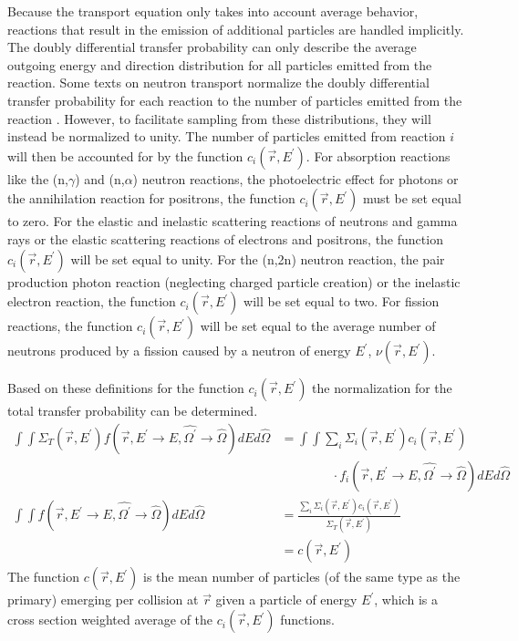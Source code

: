 Because the transport equation only takes into account average behavior, 
reactions that result in the emission of additional particles are handled 
implicitly. The doubly differential transfer probability can only describe the
average outgoing energy and direction distribution for all particles emitted
from the reaction. Some texts on neutron transport normalize the doubly
differential transfer probability for each reaction to the number of particles 
emitted from the reaction \citep{bell_nuclear_1979}. However, to facilitate 
sampling from these distributions, they will instead be normalized to unity. 
The number of particles emitted from reaction $i$ will then be accounted for by 
the function $c_i(\vec{r},E^{'})$. For absorption reactions like the 
(n,$\gamma$) and (n,$\alpha$) neutron reactions, the photoelectric effect for 
photons or the annihilation reaction for positrons, the function 
$c_i(\vec{r},E^{'})$ must be set equal to zero. For the elastic and inelastic 
scattering reactions of neutrons and gamma rays or the elastic scattering
reactions of electrons and positrons, the function $c_i(\vec{r},E^{'})$ will be 
set equal to unity. For the (n,2n) neutron reaction, the pair production photon 
reaction (neglecting charged particle creation) or the inelastic electron 
reaction, the function $c_i(\vec{r},E^{'})$ will be set equal to two. For 
fission reactions, the function $c_i(\vec{r},E^{'})$ will be set equal to the 
average number of neutrons produced by a fission caused by a neutron of energy 
$E^{'}$, $\nu(\vec{r},E^{'})$.

Based on these definitions for the function $c_i(\vec{r},E^{'})$ the 
normalization for the total transfer probability can be determined.
\begin{align}
  \int\int   \Sigma_T(\vec{r},E^{'})
  f(\vec{r},E^{'} \to E,\hat{\Omega^{'}} \to \hat{\Omega}) 
  dEd\hat{\Omega}
  & = \int\int \sum_i \Sigma_i(\vec{r},E^{'}) c_i(\vec{r},E^{'}) \nonumber \\
  & \qquad \quad \quad \cdot  
  f_i(\vec{r},E^{'} \to E,\hat{\Omega^{'}} \to \hat{\Omega}) 
  dEd\hat{\Omega} \nonumber \\
  \int\int f(\vec{r},E^{'} \to E,\hat{\Omega^{'}} \to \hat{\Omega}) 
  dEd\hat{\Omega} 
  & = \frac{\sum_i \Sigma_i(\vec{r},E^{'}) c_i(\vec{r},E^{'})}
             {\Sigma_T(\vec{r},E^{'})} \nonumber \\
  & = c(\vec{r},E^{'}) 
\end{align}
The function $c(\vec{r},E^{'})$ is the mean number of particles (of the same 
type as the primary) emerging per collision at $\vec{r}$ given a particle of 
energy $E^{'}$, which is a cross section weighted average of the 
$c_i(\vec{r},E^{'})$ functions.
  
